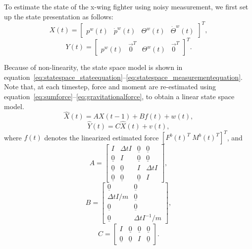 To estimate the state of the x-wing fighter using noisy measurement, we first set up the state presentation as follows:
\begin{equation}
X(t) = 
\begin{bmatrix}
p^w(t) & \dot{p}^w(t) &  \Theta^w(t) & \dot{\Theta}^w(t)
\end{bmatrix}^T,
\label{eq:statespace_state}
\end{equation}
\begin{equation}
Y(t) = 
\begin{bmatrix}
p^w(t) & \vec{0}^T &  \Theta^w(t) & \vec{0}^T
\end{bmatrix}^T.
\label{eq:statespace_measurement}
\end{equation}

Because of non-linearity, the state space model is shown in equation~\ref{eq:statespace_stateequation}–\ref{eq:statespace_measurementequation}. Note that, at each timestep, force and moment are re-estimated using equation~\ref{eq:sumforce}–\ref{eq:gravitationalforce}, to obtain a linear state space model.
\begin{equation}
\hat{X}(t) = A X(t-1) + B f(t) + w(t),
\label{eq:statespace_stateequation}
\end{equation}
\begin{equation}
\hat{Y}(t) = C \hat{X}(t) + v(t),
\label{eq:statespace_measurementequation}
\end{equation}
where $f(t)$ denotes the linearized estimated force $[F^b(t)^T \; M^b(t)^T]^T$, and
\begin{equation}
A = 
\begin{bmatrix}
I &  \Delta t I & \underline{0} & \underline{0} \\
 \underline{0} & I & \underline{0} & \underline{0} \\
  \underline{0} & \underline{0} & I & \Delta t I \\
   \underline{0} & \underline{0} & \underline{0} & I 
\end{bmatrix},
\label{eq:statespace_A}
\end{equation}
\begin{equation}
B = 
\begin{bmatrix}
\underline{0} & \underline{0} \\
\Delta t I /m & \underline{0} \\
\underline{0} & \underline{0} \\
\underline{0} & \Delta t I^{-1} /m
\end{bmatrix},
\label{eq:statespace_B}
\end{equation}
\begin{equation}
C = 
\begin{bmatrix}
I & \underline{0}  &\underline{0} & \underline{0} \\
\underline{0} & \underline{0}  & I & \underline{0} 
\end{bmatrix}.
\label{eq:statespace_C}
\end{equation}

